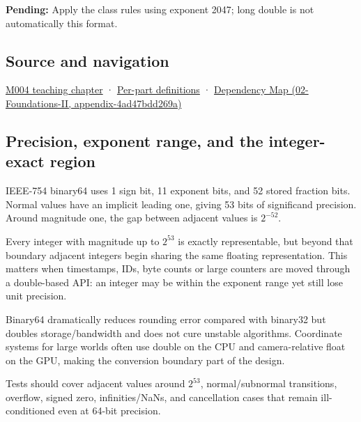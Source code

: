 \textbf{Pending:} Apply the class rules using exponent 2047; long double is not automatically this format.

\subsection{Source and navigation}\label{appendix-5078dfab64e6-source-and-navigation}

\hyperref[01-foundations-i-ch001-a-stretching-ruler-for-real-valued-quantities]{M004 teaching chapter} · \hyperref[appendix-fd090d982a15-m004---parts-61-76]{Per-part definitions} · \href{../02-Foundations-II/main.pdf\#nameddest=appendix-4ad47bdd269a}{Dependency Map (02-Foundations-II, appendix-4ad47bdd269a)}

\subsection{Precision, exponent range, and the integer-exact region}\label{appendix-5078dfab64e6-precision-exponent-range-and-the-integer-exact-region}

IEEE-754 binary64 uses 1 sign bit, 11 exponent bits, and 52 stored fraction bits. Normal values have an implicit leading one, giving 53 bits of significand precision. Around magnitude one, the gap between adjacent values is \(2^{-52}\).

Every integer with magnitude up to \(2^{53}\) is exactly representable, but beyond that boundary adjacent integers begin sharing the same floating representation. This matters when timestamps, IDs, byte counts or large counters are moved through a double-based API: an integer may be within the exponent range yet still lose unit precision.

Binary64 dramatically reduces rounding error compared with binary32 but doubles storage/bandwidth and does not cure unstable algorithms. Coordinate systems for large worlds often use double on the CPU and camera-relative float on the GPU, making the conversion boundary part of the design.

Tests should cover adjacent values around \(2^{53}\), normal/subnormal transitions, overflow, signed zero, infinities/NaNs, and cancellation cases that remain ill-conditioned even at 64-bit precision.
